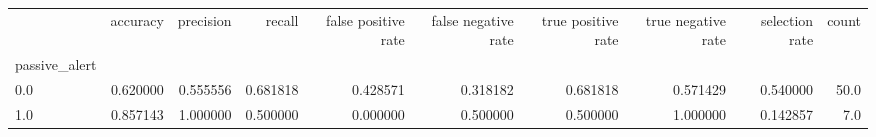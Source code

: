 \begin{tabular}{lrrrrrrrrr}
\toprule
{} &  accuracy &  precision &    recall &  false positive rate &  false negative rate &  true positive rate &  true negative rate &  selection rate &  count \\
passive\_alert &           &            &           &                      &                      &                     &                     &                 &        \\
\midrule
0.0           &  0.620000 &   0.555556 &  0.681818 &             0.428571 &             0.318182 &            0.681818 &            0.571429 &        0.540000 &   50.0 \\
1.0           &  0.857143 &   1.000000 &  0.500000 &             0.000000 &             0.500000 &            0.500000 &            1.000000 &        0.142857 &    7.0 \\
\bottomrule
\end{tabular}
